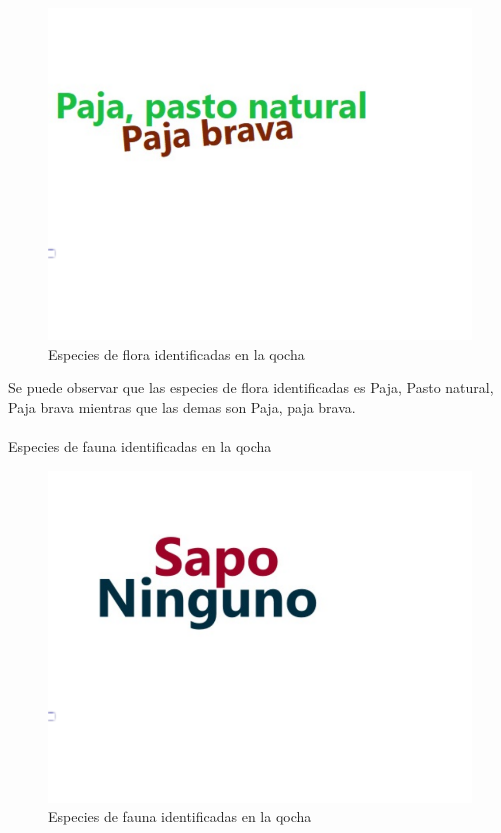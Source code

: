 \documentclass[12pt]{article}\usepackage[]{graphicx}\usepackage[]{xcolor}
\makeatletter
\def\maxwidth{ %
  \ifdim\Gin@nat@width>\linewidth
    \linewidth
  \else
    \Gin@nat@width
  \fi
}
\newenvironment{knitrout}{}{} %
\makeatother
\begin{document}
	\begin{figure}[H]
	\centering
\begin{knitrout}
\color{fgcolor}
\includegraphics[width=\maxwidth]{figure/treintayuno-1} 
\end{knitrout}
	\caption{Especies de flora identificadas en la qocha}
	\end{figure}
	Se puede observar que las especies de flora identificadas es Paja, Pasto natural, Paja brava  mientras que las demas son Paja, paja brava.\\
	\\
	Especies de fauna identificadas en la qocha
	\begin{figure}[H]
	
	\centering
\begin{knitrout}
\color{fgcolor}
\includegraphics[width=\maxwidth]{figure/treintaydos-1} 
\end{knitrout}
	\caption{Especies de fauna identificadas en la qocha}
	\end{figure}
\end{document}
